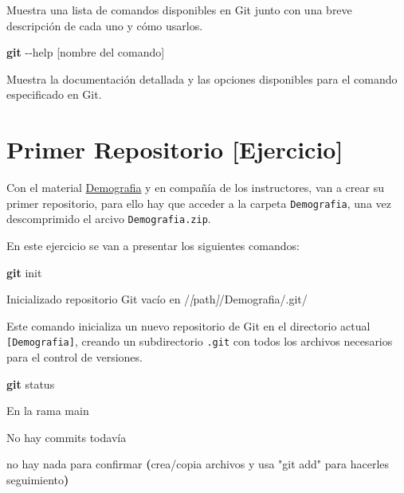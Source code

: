 \documentclass[
]{book}
\newenvironment{Shaded}{\begin{snugshade}}{\end{snugshade}}
\newcommand{\AttributeTok}[1]{\textcolor[rgb]{0.13,0.29,0.53}{#1}}
\newcommand{\ErrorTok}[1]{\textcolor[rgb]{0.64,0.00,0.00}{\textbf{#1}}}
\newcommand{\ExtensionTok}[1]{#1}
\newcommand{\FunctionTok}[1]{\textcolor[rgb]{0.13,0.29,0.53}{\textbf{#1}}}
\newcommand{\KeywordTok}[1]{\textcolor[rgb]{0.13,0.29,0.53}{\textbf{#1}}}
\newcommand{\NormalTok}[1]{#1}
\newcommand{\PreprocessorTok}[1]{\textcolor[rgb]{0.56,0.35,0.01}{\textit{#1}}}
\newcommand{\SpecialStringTok}[1]{\textcolor[rgb]{0.31,0.60,0.02}{#1}}
\newcommand{\StringTok}[1]{\textcolor[rgb]{0.31,0.60,0.02}{#1}}
\begin{document}
Muestra una lista de comandos disponibles en Git junto con una breve descripción de cada uno y cómo usarlos.

\begin{Shaded}
\begin{Highlighting}[]
\FunctionTok{git} \AttributeTok{{-}{-}help}\NormalTok{ [nombre del comando]}
\end{Highlighting}
\end{Shaded}

Muestra la documentación detallada y las opciones disponibles para el comando especificado en Git.

\section{Primer Repositorio {[}Ejercicio{]}}\label{primer-repositorio-ejercicio}

Con el material \href{material/Demografia.zip}{Demografia} y en compañía de los instructores, van a crear su primer repositorio, para ello hay que acceder a la carpeta \texttt{Demografia}, una vez descomprimido el arcivo \texttt{Demografia.zip}.

En este ejercicio se van a presentar los siguientes comandos:

\begin{Shaded}
\begin{Highlighting}[]
\FunctionTok{git}\NormalTok{ init}
\end{Highlighting}
\end{Shaded}

\begin{Shaded}
\begin{Highlighting}[]
\ExtensionTok{Inicializado}\NormalTok{ repositorio Git vacío en /}\PreprocessorTok{[}\SpecialStringTok{path}\PreprocessorTok{]}\NormalTok{/Demografia/.git/}
\end{Highlighting}
\end{Shaded}

Este comando inicializa un nuevo repositorio de Git en el directorio actual \texttt{{[}Demografia{]}}, creando un subdirectorio \texttt{.git} con todos los archivos necesarios para el control de versiones.

\begin{Shaded}
\begin{Highlighting}[]
\FunctionTok{git}\NormalTok{ status}
\end{Highlighting}
\end{Shaded}

\begin{Shaded}
\begin{Highlighting}[]
\ExtensionTok{En}\NormalTok{ la rama main}

\ExtensionTok{No}\NormalTok{ hay commits todavía}

\ExtensionTok{no}\NormalTok{ hay nada para confirmar }\ErrorTok{(}\ExtensionTok{crea/copia}\NormalTok{ archivos y usa }\StringTok{"git add"}\NormalTok{ para hacerles seguimiento}\KeywordTok{)}
\end{Highlighting}
\end{Shaded}
\end{document}
